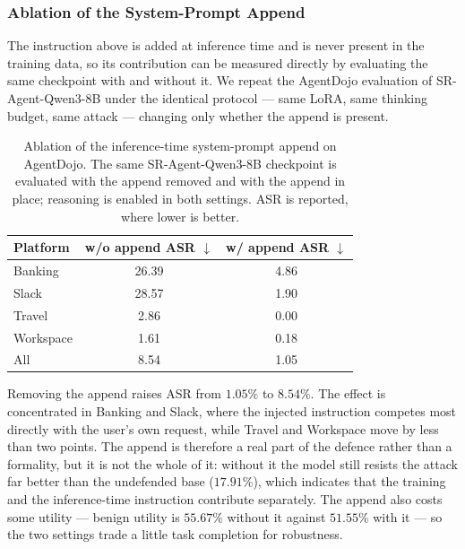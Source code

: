 
\subsubsection{Ablation of the System-Prompt Append}
\label{app:append_ablation}

The instruction above is added at inference time and is never present in the training data, so its contribution can be
measured directly by evaluating the same checkpoint with and without it. We repeat the AgentDojo evaluation of
SR-Agent-Qwen3-8B under the identical protocol --- same LoRA, same thinking budget, same attack --- changing only
whether the append is present.

\begin{table}[t]
\centering
\small
\setlength{\tabcolsep}{8pt}
\caption{Ablation of the inference-time system-prompt append on AgentDojo. The same SR-Agent-Qwen3-8B checkpoint is
evaluated with the append removed and with the append in place; reasoning is enabled in both settings. ASR is reported,
where lower is better.}
\label{tab:ablation_append}
\begin{tabular}{lcc}
\toprule
\textbf{Platform} & \textbf{w/o append ASR} $\downarrow$ & \textbf{w/ append ASR} $\downarrow$ \\
\midrule
Banking   & 26.39 & 4.86 \\
Slack     & 28.57 & 1.90 \\
Travel    & 2.86  & 0.00 \\
Workspace & 1.61  & 0.18 \\
\midrule
All       & 8.54  & 1.05 \\
\bottomrule
\end{tabular}
\end{table}

Removing the append raises ASR from $1.05\%$ to $8.54\%$. The effect is concentrated in Banking and Slack, where the
injected instruction competes most directly with the user's own request, while Travel and Workspace move by less than
two points. The append is therefore a real part of the defence rather than a formality, but it is not the whole of it:
without it the model still resists the attack far better than the undefended base ($17.91\%$), which indicates that the
training and the inference-time instruction contribute separately. The append also costs some utility --- benign
utility is $55.67\%$ without it against $51.55\%$ with it --- so the two settings trade a little task completion for
robustness.
